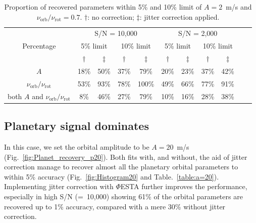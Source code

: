 \begin{table}[h!]
\centering
\begin{tabular}{|c|c|c|c|c|c|c|c|c|ll}
\cline{1-9}
\multirow{3}{*}{Percentage} & \multicolumn{4}{c|}{S/N = 10,000}                        & \multicolumn{4}{c|}{S/N = 2,000}                         &  &  \\ \cline{2-9}
                            & \multicolumn{2}{c|}{5\% limit} & \multicolumn{2}{c|}{10\% limit} & \multicolumn{2}{c|}{5\% limit} & \multicolumn{2}{c|}{10\% limit} &  &  \\ \cline{2-9}
                            				& $\dagger$     & $\ddagger$   & $\dagger$           & $\ddagger$           & $\dagger$           & $\ddagger$          & $\dagger$            & $\ddagger$          &  &  \\ \cline{1-9}
$A$                         					& 18\%            & 50\%           & 37\%            & 79\%            & 20\%            & 23\%           & 37\%             & 42\%           &  &  \\ \cline{1-9}
$\nu_\text{orb}/\nu_\text{rot}$              	& 53\%            & 93\%           & 78\%            & 100\%            & 49\%            & 66\%           & 77\%             & 91\%           &  &  \\ \cline{1-9}
both $A$ and $\nu_\text{orb}/\nu_\text{rot}$    & 8\%             & 46\%           & 27\%            & 79\%            & 10\%            & 16\%           & 28\%             & 38\%           &  &  \\ \cline{1-9}
\end{tabular}
\caption{Proportion of recovered parameters within 5\% and 10\% limit of $A = 2$~m/s and $\nu_\text{orb}/\nu_\text{rot} =0.7$. $\dagger$: no correction; $\ddagger$: jitter correction applied.}
\label{table:a=2}
\end{table}
\FloatBarrier

\subsection{Planetary signal dominates}

In this case, we set the orbital amplitude to be $A = 20$~m/s (Fig.~\ref{fig:Planet_recovery_p20}). Both fits with, and without, the aid of jitter correction manage to recover almost all the planetary orbital parameters to within 5\% accuracy (Fig.~\ref{fig:Histogram20} and Table.~\ref{table:a=20}). Implementing jitter correction with $\mathit{\Phi}$ESTA further improves the performance, especially in high S/N (=~10,000) showing 61\% of the orbital parameters are recovered up to 1\% accuracy, compared with a mere 30\% without jitter correction. 

